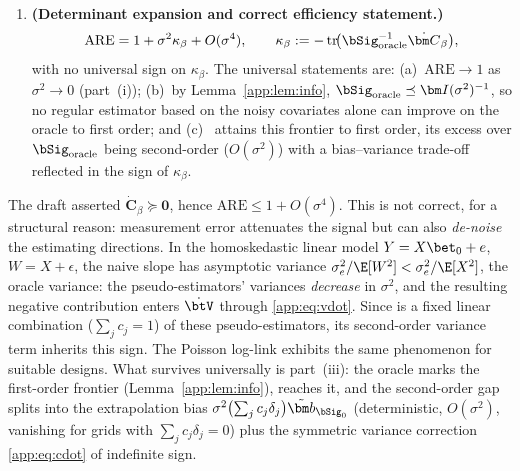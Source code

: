 \begin{theorem}
\begin{enumerate}
      function. Symmetry of $\dot{\btH}_j$ and $\dot{\btV}$ is immediate
      from \eqref{app:eq:hdot}--\eqref{app:eq:vdot}, and
      \eqref{app:eq:cdot} is a congruence-like transform of symmetric
      matrices, hence $\dot{\bm C}_\beta$ is symmetric.
      In general, however, $\dot{\bm C}_\beta$ is
      \emph{indefinite}: neither
      $\dot{\bm C}_\beta\succeq\bm 0$ nor
      $\dot{\bm C}_\beta\preceq\bm 0$ holds universally, and the
      sign of
      $\operatorname{tr}\bigl(\bSig_{\mathrm{oracle}}^{-1}
      \dot{\bm C}_\beta\bigr)$ depends on the design, the grid, and the
      degree (see Remark~\ref{app:rem:psd}).
\item[(iii)] \textbf{(Determinant expansion and correct efficiency
      statement.)}
      \[
        \mathrm{ARE}=1+\sigma^2\kappa_\beta+O(\sigma^4),
        \qquad
        \kappa_\beta:=-\operatorname{tr}\!\bigl(
          \bSig_{\mathrm{oracle}}^{-1}\dot{\bm C}_\beta\bigr),
      \]
      with no universal sign on $\kappa_\beta$. The universal
      statements are: (a)~$\mathrm{ARE}\to1$ as $\sigma^2\to0$
      (part~(i)); (b)~by Lemma~\ref{app:lem:info},
      $\bSig_{\mathrm{oracle}}\preceq\bm I(\sigma^2)^{-1}$, so no
      regular estimator based on the noisy covariates alone can improve
      on the oracle to first order; and (c)~\asimex{} attains this
      frontier to first order, its excess over
      $\bSig_{\mathrm{oracle}}$ being second-order
      ($O(\sigma^2)$) with a bias--variance trade-off reflected in the
      sign of $\kappa_\beta$.
\end{enumerate}
\end{theorem}

\begin{remark}\label{app:rem:psd}
The draft asserted $\dot{\bm C}_\beta\succeq\bm 0$, hence
$\mathrm{ARE}\le1+O(\sigma^4)$. This is not correct, for a structural
reason: measurement error attenuates the signal but can also
\emph{de-noise} the estimating directions. In the homoskedastic linear
model $Y=X\bet_0+e$, $W=X+\epsilon$, the naive slope has asymptotic variance
$\sigma_e^2/\E[W^2]<\sigma_e^2/\E[X^2]$, the oracle variance: the
pseudo-estimators' variances \emph{decrease} in $\sigma^2$, and the
resulting negative contribution enters $\dot{\btV}$ through
\eqref{app:eq:vdot}. Since \asimex{} is a fixed linear combination
($\sum_jc_j=1$) of these pseudo-estimators, its second-order variance
term inherits this sign. The Poisson log-link exhibits the same
phenomenon for suitable designs. What survives universally is
part~(iii): the oracle marks the first-order frontier
(Lemma~\ref{app:lem:info}), \asimex{} reaches it, and the second-order gap
splits into the extrapolation bias
$\sigma^2\bigl(\sum_jc_j\delta_j\bigr)\tilde{\bm b}_{\bSig_0}$
(deterministic, $O(\sigma^2)$, vanishing for grids with
$\sum_jc_j\delta_j=0$) plus the symmetric variance correction
\eqref{app:eq:cdot} of indefinite sign.
\end{remark}

